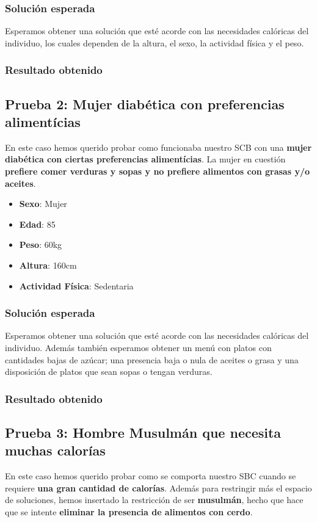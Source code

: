 \documentclass[12]{article}
\begin{document}
\subsubsection{Solución esperada}
Esperamos obtener una solución que esté acorde con las necesidades calóricas del individuo, los cuales dependen de la altura, el sexo, la actividad física y el peso.

\subsubsection{Resultado obtenido}

\subsection{Prueba 2: Mujer diabética con preferencias alimentícias}
En este caso hemos querido probar como funcionaba nuestro SCB con una \textbf{mujer diabética con ciertas preferencias alimentícias}. La mujer en cuestión \textbf{prefiere comer verduras y sopas y no prefiere alimentos con grasas y/o aceites}.  

\begin{itemize}
\item \textbf{Sexo}: Mujer
\item \textbf{Edad}: 85
\item \textbf{Peso}: 60kg
\item \textbf{Altura}: 160cm
\item \textbf{Actividad Física}: Sedentaria
\end{itemize}

\subsubsection{Solución esperada}
Esperamos obtener una solución que esté acorde con las necesidades calóricas del individuo. Además también esperamos obtener un menú con platos con cantidades bajas de azúcar; una presencia baja o nula de aceites o grasa y una disposición de platos que sean sopas o tengan verduras.

\subsubsection{Resultado obtenido}

\subsection{Prueba 3: Hombre Musulmán que necesita muchas calorías}
En este caso hemos querido probar como se comporta nuestro SBC cuando se requiere \textbf{una gran cantidad de calorías}. Además para restringir más el espacio de soluciones, hemos insertado la restricción de ser \textbf{musulmán}, hecho que hace que se intente \textbf{eliminar la presencia de alimentos con cerdo}. 
\end{document}
